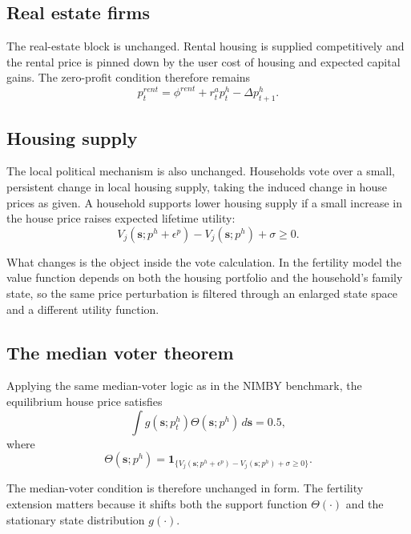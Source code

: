 \documentclass[11pt]{article}
\begin{document}
\subsection{Real estate firms}

The real-estate block is unchanged. Rental housing is supplied competitively and the rental price
is pinned down by the user cost of housing and expected capital gains. The zero-profit condition
therefore remains
\begin{equation}
p_t^{rent} = \phi^{rent} + r_t^a p_t^h - \Delta p_{t+1}^h.
\end{equation}

\subsection{Housing supply}

The local political mechanism is also unchanged. Households vote over a small, persistent change
in local housing supply, taking the induced change in house prices as given. A household supports
lower housing supply if a small increase in the house price raises expected lifetime utility:
\begin{equation}
V_j(\mathbf{s}; p^h+\epsilon^p) - V_j(\mathbf{s}; p^h) + \sigma \geq 0.
\end{equation}

What changes is the object inside the vote calculation. In the fertility model the value
function depends on both the housing portfolio and the household's family state, so the same
price perturbation is filtered through an enlarged state space and a different utility function.

\subsection{The median voter theorem}

Applying the same median-voter logic as in the NIMBY benchmark, the equilibrium house price
satisfies
\begin{equation}
\int g(\mathbf{s}; p_t^h)\Theta(\mathbf{s}; p^h)\, d\mathbf{s} = 0.5,
\end{equation}
where
\begin{equation}
\Theta(\mathbf{s}; p^h) =
\mathbf{1}_{\{V_j(\mathbf{s}; p^h+\epsilon^p)-V_j(\mathbf{s}; p^h)+\sigma \geq 0\}}.
\end{equation}

The median-voter condition is therefore unchanged in form. The fertility extension matters because
it shifts both the support function $\Theta(\cdot)$ and the stationary state distribution
$g(\cdot)$.
\end{document}
